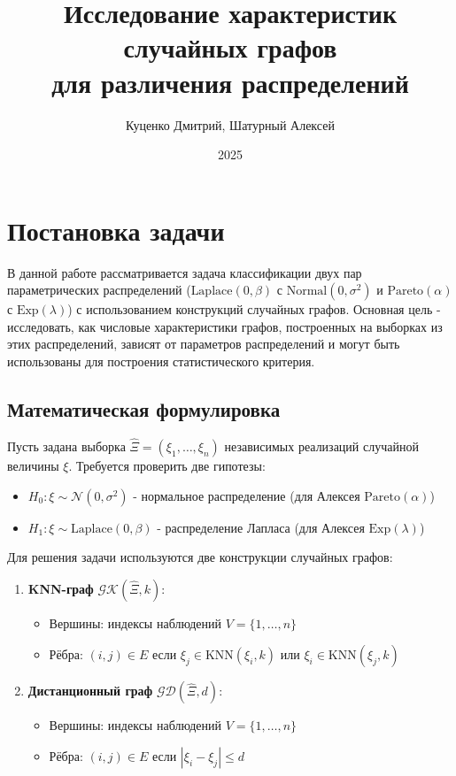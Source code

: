 \documentclass[a4paper,12pt]{article}
\title{Исследование характеристик случайных графов \\ для различения распределений}
\author{Куценко Дмитрий, Шатурный Алексей}
\date{2025}
\begin{document}
\maketitle

\section{Постановка задачи}
В данной работе рассматривается задача классификации двух пар параметрических распределений ($\text{Laplace}(0, \beta)$ с $\text{Normal}(0, \sigma^2)$ и $\text{Pareto}(\alpha)$ с $\text{Exp}(\lambda)$)  с использованием конструкций случайных графов. Основная цель - исследовать, как числовые характеристики графов, построенных на выборках из этих распределений, зависят от параметров распределений и могут быть использованы для построения статистического критерия.

\subsection{Математическая формулировка}
Пусть задана выборка $\hat{\Xi} = (\xi_1, \ldots, \xi_n)$ независимых реализаций случайной величины $\xi$. Требуется проверить две гипотезы:
\begin{itemize}
    \item $H_0: \xi \sim \mathcal{N}(0, \sigma^2)$ - нормальное распределение (для Алексея $\text{Pareto}(\alpha)$)
    \item $H_1: \xi \sim \text{Laplace}(0, \beta)$ - распределение Лапласа (для Алексея $\text{Exp}(\lambda)$)
\end{itemize}

Для решения задачи используются две конструкции случайных графов:
\begin{enumerate}
    \item \textbf{KNN-граф} $\mathcal{GK}(\hat{\Xi}, k)$:
    \begin{itemize}
        \item Вершины: индексы наблюдений $V = \{1, \ldots, n\}$
        \item Рёбра: $(i,j) \in E$ если $\xi_j \in \text{KNN}(\xi_i, k)$ или $\xi_i \in \text{KNN}(\xi_j, k)$
    \end{itemize}
    
    \item \textbf{Дистанционный граф} $\mathcal{GD}(\hat{\Xi}, d)$:
    \begin{itemize}
        \item Вершины: индексы наблюдений $V = \{1, \ldots, n\}$
        \item Рёбра: $(i,j) \in E$ если $|\xi_i - \xi_j| \leq d$
    \end{itemize}
\end{enumerate}
\end{document}
